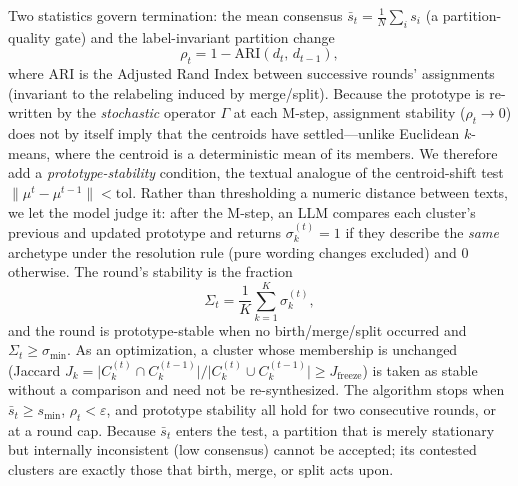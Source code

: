 Two statistics govern termination: the mean consensus
$\bar s_t=\frac{1}{N}\sum_i s_i$ (a partition-quality gate) and the
label-invariant partition change
\begin{equation}
\rho_t = 1-\mathrm{ARI}\!\left(d_t,\,d_{t-1}\right),
\label{eq:rho}
\end{equation}
where $\mathrm{ARI}$ is the Adjusted Rand Index between successive rounds'
assignments (invariant to the relabeling induced by merge/split). Because the
prototype is re-written by the \emph{stochastic} operator $\Gamma$ at each
M-step, assignment stability ($\rho_t\!\to\!0$) does not by itself imply that the
centroids have settled---unlike Euclidean $k$-means, where the centroid is a
deterministic mean of its members. We therefore add a \emph{prototype-stability}
condition, the textual analogue of the centroid-shift test
$\lVert\mu^{t}-\mu^{t-1}\rVert<\mathrm{tol}$. Rather than thresholding a numeric
distance between texts, we let the model judge it: after the M-step, an LLM
compares each cluster's previous and updated prototype and returns
$\sigma_k^{(t)}=1$ if they describe the \emph{same} archetype under the resolution
rule (pure wording changes excluded) and $0$ otherwise. The round's stability is
the fraction
\begin{equation}
\Sigma_t=\frac1K\sum_{k=1}^{K}\sigma_k^{(t)},
\label{eq:protostab}
\end{equation}
and the round is prototype-stable when no birth/merge/split occurred and
$\Sigma_t\ge\sigma_{\min}$. As an optimization, a cluster whose membership is
unchanged (Jaccard $J_k=\lvert C_k^{(t)}\cap C_k^{(t-1)}\rvert/\lvert
C_k^{(t)}\cup C_k^{(t-1)}\rvert\ge J_{\mathrm{freeze}}$) is taken as stable without
a comparison and need not be re-synthesized. The algorithm stops when $\bar
s_t\ge s_{\min}$, $\rho_t<\varepsilon$, and prototype stability all hold for two
consecutive rounds, or at a round cap. Because $\bar s_t$ enters the test, a
partition that is merely stationary but internally inconsistent (low consensus)
cannot be accepted; its contested clusters are exactly those that birth, merge,
or split acts upon.

